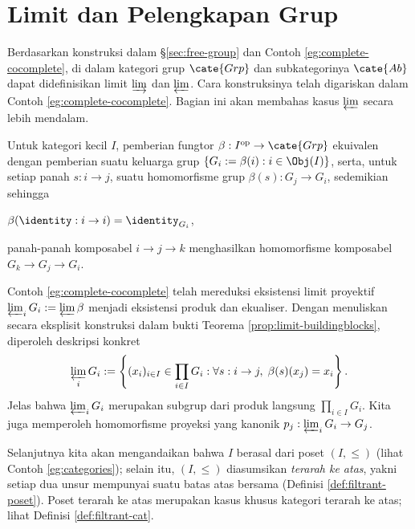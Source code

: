 \section{Limit dan Pelengkapan Grup}\label{sec:group-limit}
Berdasarkan konstruksi dalam \S\ref{sec:free-group} dan Contoh \ref{eg:complete-cocomplete}, di dalam kategori grup $\cate{Grp}$ dan subkategorinya $\cate{Ab}$ dapat didefinisikan limit $\varinjlim$ dan $\varprojlim$. Cara konstruksinya telah digariskan dalam Contoh \ref{eg:complete-cocomplete}. Bagian ini akan membahas kasus $\varprojlim$ secara lebih mendalam.

Untuk kategori kecil $I$, pemberian fungtor $\beta: I^\text{op} \to \cate{Grp}$ ekuivalen dengan pemberian suatu keluarga grup $\{ G_i := \beta(i) : i \in \Obj(I) \}$, serta, untuk setiap panah $s: i \to j$, suatu homomorfisme grup $\beta(s): G_j \to G_i$, sedemikian sehingga
\begin{compactitem}
	\item $\beta(\identity: i \to i)=\identity_{G_i}$,
	\item panah-panah komposabel $i \to j \to k$ menghasilkan homomorfisme komposabel $G_k \to G_j \to G_i$.
\end{compactitem}
Contoh \ref{eg:complete-cocomplete} telah mereduksi eksistensi limit proyektif $\varprojlim_i G_i := \varprojlim \beta$ menjadi eksistensi produk dan ekualiser. Dengan menuliskan secara eksplisit konstruksi dalam bukti Teorema \ref{prop:limit-buildingblocks}, diperoleh deskripsi konkret
\[
	\varprojlim_i G_i := \left\{ (x_i)_{i \in I} \in \prod_{i \in I} G_i : \forall s: i \to j, \; \beta(s)(x_j) = x_i \right\}.
\]
Jelas bahwa $\varprojlim_i G_i$ merupakan subgrup dari produk langsung $\prod_{i \in I} G_i$. Kita juga memperoleh homomorfisme proyeksi yang kanonik $p_j: \varprojlim_i G_i \to G_j$.

Selanjutnya kita akan mengandaikan bahwa $I$ berasal dari poset $(I, \leq)$ (lihat Contoh \ref{eg:categories}); selain itu, $(I, \leq)$ diasumsikan \emph{terarah ke atas}, yakni setiap dua unsur mempunyai suatu batas atas bersama (Definisi \ref{def:filtrant-poset}). Poset terarah ke atas merupakan kasus khusus kategori terarah ke atas; lihat Definisi \ref{def:filtrant-cat}.


